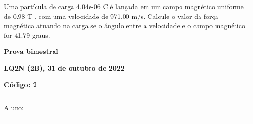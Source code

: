\documentclass[12pt, addpoints]{exam}
\begin{document}
\begin{questions}
\begin{multicols*}{2}
\begin{oneparchoices}
\end{oneparchoices}
\question[20] Uma partícula de carga 4.04e-06 C é lançada em um campo magnético uniforme de    0.98 T , com uma velocidade de 971.00 m/s. Calcule o valor da força magnética atuando na carga se o ângulo entre a velocidade e o campo magnético for   41.79 graus.

\begin{oneparchoices}
\end{oneparchoices}
\end{multicols*}
\end{questions}
\newpage
        \begin{minipage}[b]{0.75\linewidth}
            \begin{flushleft}
                {\bf \large Prova bimestral}
            \end{flushleft}
            \begin{flushleft}
                {\bf \large LQ2N (2B), 31 de outubro de 2022}
            \end{flushleft}
        \end{minipage}
        \begin{minipage}[b]{0.20\linewidth}
            \begin{flushright}
                {\bf \large Código: 2}
            \end{flushright}
        \end{minipage}
        \vspace{0.5cm} \hrule \vspace{0.5cm}
        \begin{minipage}{0.75\linewidth}
            Aluno:
        \end{minipage}
        \vspace{0.5cm} \hrule \vspace{0.5cm}
\end{document}
